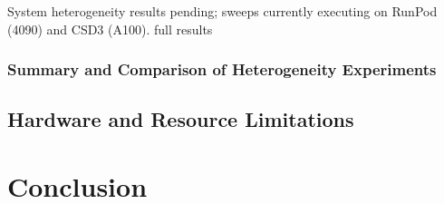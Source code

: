 \documentclass[11pt,a4paper]{report}  %
\newif\ifshowtodo
\newcommand{\TODOhpc}[1]{%
  \ifshowtodo\textcolor{red}{\textbf{[HPC PENDING: #1]}}\else#1\fi}
\begin{document}


System heterogeneity results pending; sweeps currently executing on
RunPod (4090) and CSD3 (A100). \TODOhpc{full results}

\subsection{Summary and Comparison of Heterogeneity Experiments}
\label{sec:summary-het}


\section{Hardware and Resource Limitations}
\label{sec:hardware}


\chapter{Conclusion}
\label{ch:conclusion}
\end{document}

